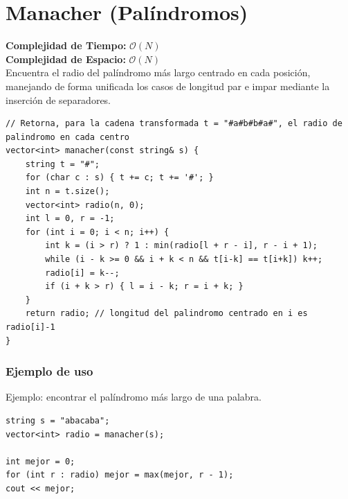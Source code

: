 \documentclass[10pt,twocolumn,letterpaper]{report}
\begin{document}
\section{Manacher (Palíndromos)}
\textbf{Complejidad de Tiempo:} $\mathcal{O}(N)$ \\
\textbf{Complejidad de Espacio:} $\mathcal{O}(N)$ \\
Encuentra el radio del palíndromo más largo centrado en cada posición, manejando de forma unificada los casos de longitud par e impar mediante la inserción de separadores.
\begin{lstlisting}
// Retorna, para la cadena transformada t = "#a#b#b#a#", el radio de palindromo en cada centro
vector<int> manacher(const string& s) {
    string t = "#";
    for (char c : s) { t += c; t += '#'; }
    int n = t.size();
    vector<int> radio(n, 0);
    int l = 0, r = -1;
    for (int i = 0; i < n; i++) {
        int k = (i > r) ? 1 : min(radio[l + r - i], r - i + 1);
        while (i - k >= 0 && i + k < n && t[i-k] == t[i+k]) k++;
        radio[i] = k--;
        if (i + k > r) { l = i - k; r = i + k; }
    }
    return radio; // longitud del palindromo centrado en i es radio[i]-1
}
\end{lstlisting}
\subsubsection*{Ejemplo de uso}
Ejemplo: encontrar el palíndromo más largo de una palabra.
\begin{lstlisting}
string s = "abacaba";
vector<int> radio = manacher(s);

int mejor = 0;
for (int r : radio) mejor = max(mejor, r - 1);
cout << mejor;
\end{lstlisting}
\end{document}
